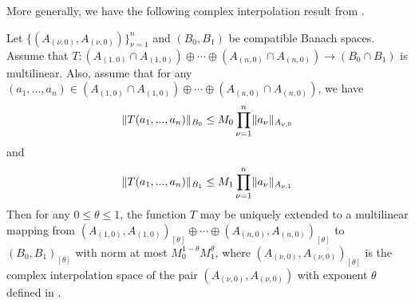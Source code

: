 \documentclass[11pt]{amsart}
\numberwithin{equation}{section}
\numberwithin{equation}{section}
\DeclarePairedDelimiter{\norm}{\lVert}{\rVert}
\theoremstyle{remark}
\theoremstyle{definition}
\begin{document}
More generally, we have the following complex interpolation result from \cite{bergh2012interpolation}.
\begin{theorem}\label{thm:compinterp}
    Let $\{(A_{(\nu,0)},A_{(\nu,0)})\}_{\nu=1}^{n}$ and $(B_0,B_1)$ be compatible Banach spaces. Assume that $T: (A_{(1,0)} \cap A_{(1,0)}) \oplus \cdots \oplus (A_{(n,0)} \cap A_{(n,0)}) \to (B_0 \cap B_1)$ is multilinear.
    Also, assume that for any $(a_1,...,a_n) \in (A_{(1,0)} \cap A_{(1,0)}) \oplus \cdots \oplus (A_{(n,0)} \cap A_{(n,0)})$, we have
    \begin{align*}
        \norm{T(a_1,...,a_n)}_{B_0} \le M_0 \prod \limits_{\nu=1}^{n} \norm{a_{\nu}}_{A_{\nu,0}}
    \end{align*}
    and
    \begin{align*}
        \norm{T(a_1,...,a_n)}_{B_1} \le M_1 \prod \limits_{\nu=1}^{n} \norm{a_{\nu}}_{A_{\nu,1}}
    \end{align*}
    Then for any $0 \le \theta \le 1$, the function $T$ may be uniquely extended to a multilinear mapping from $(A_{(1,0)}, A_{(1,0)})_{[\theta]} \oplus \cdots \oplus (A_{(n,0)}, A_{(n,0)})_{[\theta]}$ to $(B_0,B_1)_{[\theta]}$ with norm at most $M_0^{1-\theta}M_1^{\theta}$, where $(A_{(\nu,0)}, A_{(\nu,0)})_{[\theta]}$ is the complex interpolation space of the pair $(A_{(\nu,0)}, A_{(\nu,0)})$ with exponent $\theta$ defined in \cite[p.88]{bergh2012interpolation}.
\end{theorem}
\end{document}
